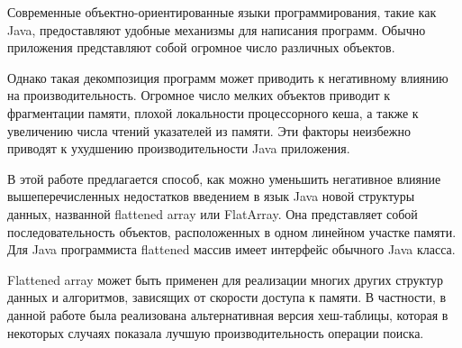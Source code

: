 Современные объектно-ориентированные языки программирования, такие как Java, предоставляют удобные механизмы для написания программ. Обычно приложения представляют собой огромное число различных объектов. 
\par
Однако такая декомпозиция программ может приводить к негативному влиянию на производительность. Огромное число мелких объектов приводит к фрагментации памяти, плохой локальности процессорного кеша, а также к увеличению числа чтений указателей из памяти. Эти факторы неизбежно приводят к ухудшению производительности Java приложения.
\par
В этой работе предлагается способ, как можно уменьшить негативное влияние вышеперечисленных недостатков введением в язык Java новой структуры данных, названной flattened array или FlatArray. Она представляет собой последовательность объектов, расположенных в одном линейном участке памяти. 
Для Java программиста flattened массив имеет интерфейс обычного Java класса.
\par
Flattened array может быть применен для реализации многих других структур данных и алгоритмов, зависящих от скорости доступа к памяти. В частности, в данной работе была реализована альтернативная версия хеш-таблицы, которая в некоторых случаях показала лучшую производительность операции поиска.
\clearpage


